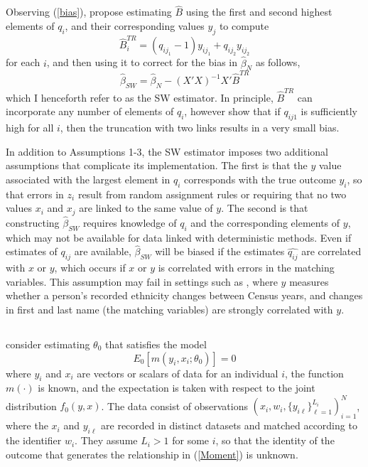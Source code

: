 \documentclass[12pt]{article}
\begin{document}
Observing (\ref{bias}), \cite{sw1993} propose estimating $\hat{B}$ using the first and second highest elements of $q_i$, and their corresponding values $y_j$ to compute 
\begin{equation} \hat{B}_i^{TR} = (q_{ij_1} - 1) y_{ij_1} + q_{ij_2} y_{ij_2} \label{bHat} \end{equation}
for each $i$, and then using it to correct for the bias in $\hat{\beta}_N$ as follows,
\begin{equation} \hat{\beta}_{SW} = \hat{\beta}_N - (X'X)^{-1} X' \hat{B}^{TR} \label{sw}\end{equation}
which I henceforth refer to as the SW estimator.  In principle, $\hat{B}^{TR}$ can incorporate any number of elements of $q_i$, however \cite{sw1993} show that if $q_{ij1}$ is sufficiently high for all $i$, then the truncation with two links results in a very small bias.  
 
In addition to Assumptions 1-3, the SW estimator imposes two additional assumptions that complicate its implementation.  The first is that the $y$ value associated with the largest element in $q_i$ corresponds with the true outcome $y_i$, so that errors in $z_i$ result from random assignment rules or requiring that no two values $x_i$ and $x_j$ are linked to the same value of $y$.  The second is that constructing $\hat{\beta}_{SW}$ requires knowledge of $q_{i}$ and the corresponding elements of $y$, which may not be available for data linked with deterministic methods.  Even if estimates of $q_{ij}$ are available, $\hat{\beta}_{SW}$ will be biased if the estimates $\widehat{q_{ij}}$ are correlated with $x$ or $y$, which occurs if $x$ or $y$ is correlated with errors in the matching variables.  This assumption may fail in settings such as \cite{nq2015}, where $y$ measures whether a person's recorded ethnicity changes between Census years, and changes in first and last name (the matching variables) are strongly correlated with $y$.  

\subsection{\citet*{ahl2019}}

\citet*{ahl2019} consider estimating $\theta_0$ that satisfies the model
\begin{equation}
E_0\left[ m\left( y_{i},x_{i};\theta _{0}\right) \right] =0
\label{Moment}
\end{equation}%
where $y_{i}$ and $x_{i}$ are vectors or scalars of data for an individual $i$, the function $m(\cdot)$ is known, and the expectation is taken with respect to the joint distribution $f_0(y,x)$.  The data consist of observations $\left(x_i, w_i, \{y_{i\ell}\}_{\ell=1}^{L_i}\right)_{i=1}^N$, where the $x_i$ and $y_{i\ell}$ are recorded in distinct datasets and matched according to the identifier $w_i$.  They assume $L_i > 1$ for some $i$, so that the identity of the outcome that generates the relationship in (\ref{Moment}) is unknown.  
\end{document}
